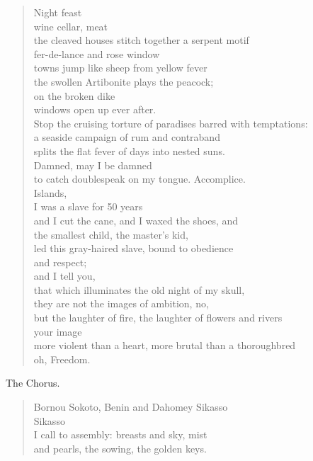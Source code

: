 \documentclass[letterpaper,article,12pt,oneside,notitlepage]{memoir}
\begin{document}
\begin{verse}
Night feast \\
wine cellar, meat \\
the cleaved houses stitch together a serpent motif \\
fer-de-lance and rose window \\
towns jump like sheep from yellow fever \\
the swollen Artibonite plays the peacock; \\
on the broken dike \\
windows open up ever after. \\
Stop the cruising torture of paradises barred with temptations: \\
a seaside campaign of rum and contraband \\
splits the flat fever of days into nested suns. \\
Damned, may I be damned \\
to catch doublespeak on my tongue. Accomplice. \\
Islands, \\
I was a slave for 50 years \\
and I cut the cane, and I waxed the shoes, and \\
the smallest child, the master's kid, \\
led this gray-haired slave, bound to obedience \\
and respect; \\
and I tell you, \\
that which illuminates the old night of my skull, \\
they are not the images of ambition, no, \\
but the laughter of fire, the laughter of flowers and rivers \\
your image \\
more violent than a heart, more brutal than a thoroughbred \\
oh, Freedom. \\
\end{verse}

\begin{center}The Chorus.\end{center}

\begin{verse}
Bornou Sokoto, Benin and Dahomey Sikasso \\
Sikasso \\
I call to assembly: breasts and sky, mist \\
and pearls, the sowing, the golden keys. \\
\end{verse}
\end{document}
